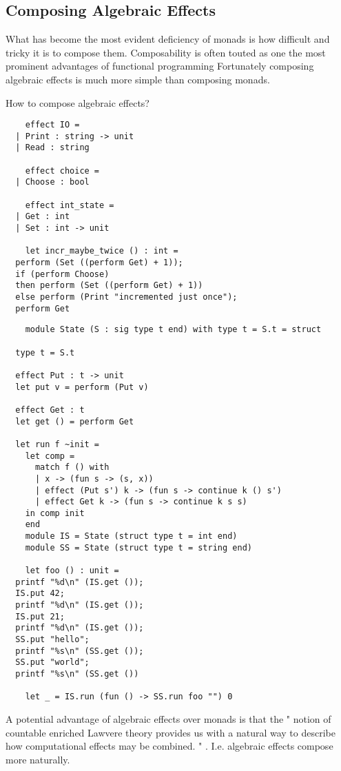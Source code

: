 \subsection{Composing Algebraic Effects}
What has become the most evident deficiency of monads is
how difficult and tricky it is to compose them.
Composability is often touted as one the most
prominent advantages of functional programming
Fortunately composing algebraic effects is much more simple than composing monads.

How to compose algebraic effects?
\begin{example}
    \begin{verbatim}
    effect IO =
  | Print : string -> unit
  | Read : string

    effect choice =
  | Choose : bool

    effect int_state =
  | Get : int
  | Set : int -> unit

    let incr_maybe_twice () : int =
  perform (Set ((perform Get) + 1));
  if (perform Choose)
  then perform (Set ((perform Get) + 1))
  else perform (Print "incremented just once");
  perform Get
    \end{verbatim}

    \begin{verbatim}
    module State (S : sig type t end) with type t = S.t = struct

  type t = S.t

  effect Put : t -> unit
  let put v = perform (Put v)

  effect Get : t
  let get () = perform Get

  let run f ~init =
    let comp =
      match f () with
      | x -> (fun s -> (s, x))
      | effect (Put s') k -> (fun s -> continue k () s')
      | effect Get k -> (fun s -> continue k s s)
    in comp init
    end
    module IS = State (struct type t = int end)
    module SS = State (struct type t = string end)

    let foo () : unit =
  printf "%d\n" (IS.get ());
  IS.put 42;
  printf "%d\n" (IS.get ());
  IS.put 21;
  printf "%d\n" (IS.get ());
  SS.put "hello";
  printf "%s\n" (SS.get ());
  SS.put "world";
  printf "%s\n" (SS.get ())

    let _ = IS.run (fun () -> SS.run foo "") 0
    \end{verbatim}
\end{example}

A potential advantage of algebraic effects over monads is that
the "
notion of countable enriched Lawvere theory
provides us with a natural way to describe
how computational effects may be combined.
"
\cite{plotkin2004computational}.
I.e. algebraic effects compose more naturally.

